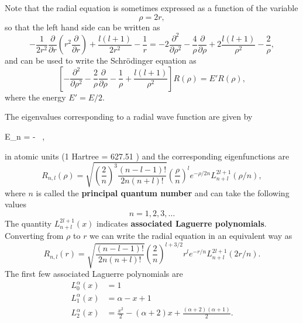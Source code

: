 \documentclass[../Main/chem331-notes.tex]{subfiles}
\begin{document}
Note that the radial equation is sometimes expressed as a function of the variable
\begin{equation}
\rho = 2r,
\end{equation}
so that the left hand side can be written as
\begin{equation}
-\frac{1}{2r^2} \frac{\partial}{\partial r} \left( r^2 \frac{\partial  }{\partial r} \right) + \frac{l(l+1)}{2r^2} - \frac{1}{r}
= -2 \frac{\partial^2}{\partial \rho^2}
-\frac{4}{\rho} \frac{\partial}{\partial \rho} + 2\frac{l(l+1)}{\rho^2} - \frac{2}{\rho},
\end{equation}
and can be used to write the Schr\"{o}dinger equation as
\begin{equation}
\left[
-\frac{\partial^2 }{\partial \rho^2}
-\frac{2}{\rho}\frac{\partial }{\partial \rho}
-\frac{1}{\rho} + \frac{l(l+1)}{\rho^2} \right] R(\rho) = E' R(\rho),
\end{equation}
where the energy $E' = E / 2$.

The eigenvalues corresponding to a radial wave function are given by
\begin{iequation}
E_n = -   \, ,
\end{iequation}
in atomic units (1 Hartree = 627.51 ) and the corresponding eigenfunctions are
\begin{equation}
R_{n,l}(\rho) = \sqrt{\left(\frac{2}{n} \right)^{3} \frac{ (n-l-1)! }{ 2n (n+l)!} }\left(\frac{\rho}{n}\right)^l e^{-\rho/2n} L_{n+l}^{2l+1}(\rho/n),
\end{equation}
where $n$ is called the \textbf{principal quantum number} and can take the following values
\begin{equation}
n = 1, 2, 3, \ldots
\end{equation}
The quantity $L_{n+l}^{2l+1}(x)$ indicates \textbf{associated Laguerre polynomials}.
Converting from $\rho$ to $r$ we can write the radial equation in an equivalent way as
\begin{equation}
R_{n,l}(r) = \sqrt{\frac{ (n-l-1)! }{ 2n (n+l)!} } \left(\frac{2}{n} \right)^{l + 3/2} r^l e^{-r/n} L_{n+l}^{2l+1}(2r/n).
\end{equation}
The first few associated Laguerre polynomials are
\begin{equation}
\begin{split}
L_0^\alpha(x) & = 1 \\
L_1^\alpha(x) & = \alpha - x + 1 \\
L_2^\alpha(x) & = \frac{x^2}{2} - (\alpha + 2) x + \frac{(\alpha + 2)(\alpha + 1)}{2}.
\end{split}
\end{equation}
\end{document}
